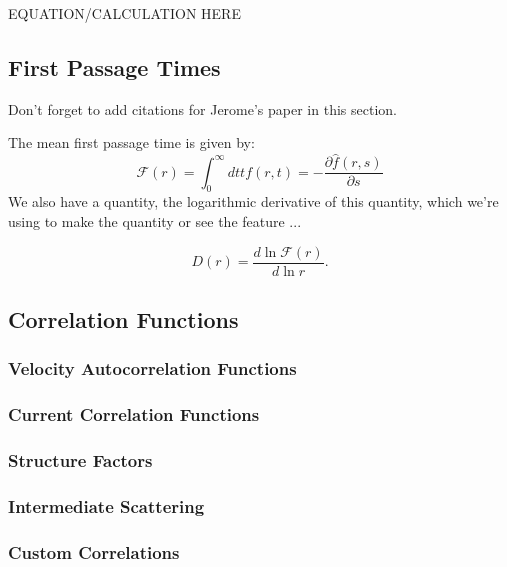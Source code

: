 EQUATION/CALCULATION HERE


\subsection{First Passage Times}

Don't forget to add citations for Jerome's paper in this section.

The mean first passage time is given by:
\begin{equation*}
    \mathcal{F}(r) = \int_{0}^{\infty} dt t f(r, t) = - \frac{\partial \hat{f}(r,s)}{\partial s}
\end{equation*}
We also have a quantity, the logarithmic derivative of this quantity, which we're 
using to make the quantity or see the feature ...

\begin{equation*}
    D(r) = \frac{d \ln{\mathcal{F}(r)}}{d \ln{r}}.
\end{equation*}


\subsection{Correlation Functions}

\subsubsection{Velocity Autocorrelation Functions}

\subsubsection{Current Correlation Functions}

\subsubsection{Structure Factors}

\subsubsection{Intermediate Scattering}

\subsubsection{Custom Correlations}
